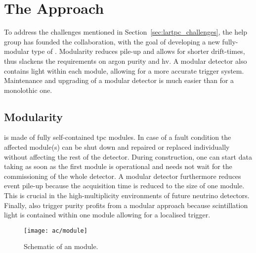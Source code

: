 \section{The \AC{} Approach}
\label{sec:ac_argoncube}

To address the challenges mentioned in Section~\ref{sec:lartpc_challenges}, the \gls{help} group has founded the \AC{} collaboration, with the goal of developing a new fully-modular type of \lartpc{}.
Modularity reduces pile-up and allows for shorter drift-times, thus slackens the requirements on argon purity and \gls{hv}.
A modular detector also contains light within each module, allowing for a more accurate trigger system.
Maintenance and upgrading of a modular detector is much easier than for a monolothic one.


\subsection{Modularity}
\label{sec:ac_argoncube_mod}

\AC{} is made of fully self-contained \gls{tpc} modules.
In case of a fault condition the affected module(s) can be shut down and repaired or replaced individually without affecting the rest of the detector.
During construction, one can start data taking as soon as the first module is operational and needs not wait for the commissioning of the whole detector.
A modular detector furthermore reduces event pile-up because the acquisition time is reduced to the size of one module.
This is crucial in the high-multiplicity environments of future \lar{} neutrino detectors.
Finally, also trigger purity profits from a modular approach because scintillation light is contained within one module allowing for a localised trigger.

\begin{figure}[htb]
	\centering
	\texttt{[image: ac/module]}
	\caption[\AC{} module schematic]{%
		Schematic of an \AC{} module.
	}
	\label{fig:ac_module}
\end{figure}

